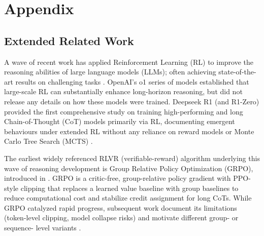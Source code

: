 \newpage
\section{Appendix}

\subsection{Extended Related Work}\label{appendix:related}

A wave of recent work has applied Reinforcement Learning (RL) to improve the reasoning abilities of large language models (LLMs); often achieving state-of-the-art results on challenging tasks \citep{openai-o1, guo2025deepseek, seed2025seed1, carbonneaux2025cwm}. OpenAI's o1 series of models established that large-scale RL can substantially enhance long-horizon reasoning, but did not release any details on how these models were trained. Deepseek R1 (and R1-Zero) \citep{guo2025deepseek} provided the first comprehensive study on training high-performing and long Chain-of-Thought (CoT) models primarily via RL, documenting emergent behaviours under extended RL without any reliance on reward models \citep{lightman2023let} or Monte Carlo Tree Search (MCTS) \citep{xie2024monte}.

The earliest widely referenced RLVR (verifiable-reward) algorithm underlying this wave of reasoning development is Group Relative Policy Optimization (GRPO), introduced in \citet{shao2024deepseekmath}. GRPO is a critic-free, group-relative policy gradient with PPO-style clipping that replaces a learned value baseline with group baselines to reduce computational cost and stabilize credit assignment for long CoTs. While GRPO catalyzed rapid progress, subsequent work document its limitations (token-level clipping, model collapse risks) and motivate different group- or sequence- level variants \citep{yu2025dapo, yue2025vapo, hu2025open, gspo}.

